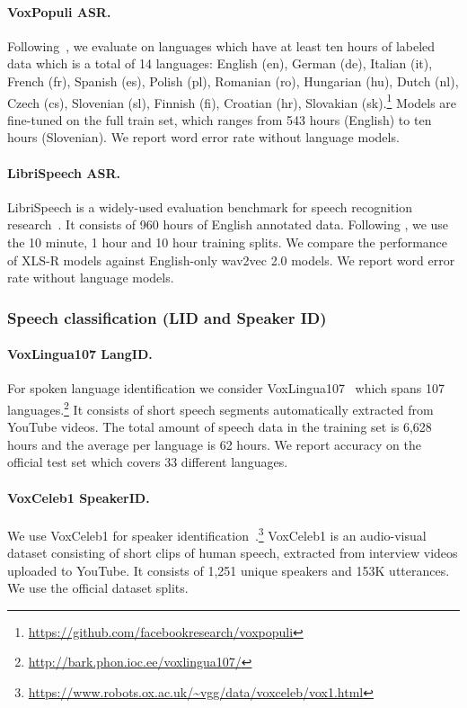 \documentclass{article} \usepackage{iclr2022_conference,times}
\begin{document}
\paragraph{VoxPopuli ASR.}{
Following~\cite{wang2021voxpopuli}, we evaluate on languages which have at least ten hours of labeled data which is a total of 14 languages: English (en), German (de), Italian (it), French (fr), Spanish (es), Polish (pl), Romanian (ro), Hungarian (hu), Dutch (nl), Czech (cs), Slovenian (sl), Finnish (fi), Croatian (hr), Slovakian (sk).\footnote{\small\url{https://github.com/facebookresearch/voxpopuli}}
Models are fine-tuned on the full train set, which ranges from 543 hours (English) to ten hours (Slovenian). We report word error rate without language models.
}

\paragraph{LibriSpeech ASR.}{
LibriSpeech is a widely-used evaluation benchmark for speech recognition research~\citep{panayotov2015librispeech}. It consists of 960 hours of English annotated data. Following \cite{baevski2020wav}, we use the 10 minute, 1 hour and 10 hour training splits. We compare the performance of XLS-R models against English-only wav2vec 2.0 models. We report word error rate without language models.
}

\subsubsection{Speech classification (LID and Speaker ID)}
\label{sec:setup_lid}

\paragraph{VoxLingua107 LangID.}{For spoken language identification we consider VoxLingua107~\citep{valk2020voxlingua107} which spans 107 languages.\footnote{\url{http://bark.phon.ioc.ee/voxlingua107/}} 
It consists of short speech segments automatically extracted from YouTube videos. 
The total amount of speech data in the training set is 6,628 hours and the average per language is 62 hours. 
We report accuracy on the official test set which covers 33 different languages.}

\paragraph{VoxCeleb1 SpeakerID.}{We use VoxCeleb1 for speaker identification~\citep{Nagrani17}.\footnote{\url{https://www.robots.ox.ac.uk/~vgg/data/voxceleb/vox1.html}} VoxCeleb1 is an audio-visual dataset consisting of short clips of human speech, extracted from interview videos uploaded to YouTube. 
It consists of 1,251 unique speakers and 153K utterances. 
We use the official dataset splits.
}
\end{document}
